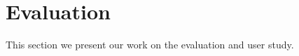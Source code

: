 
\section{Evaluation}
\label{sec:evaluation}

This section we present our work on the evaluation and user study.


